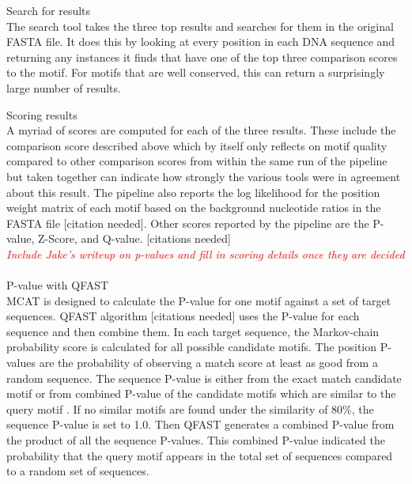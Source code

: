\documentclass[12pt]{article}
\newenvironment{SLOPPY}{\begin{sloppypar}\hbadness=10000}{\end{sloppypar}}
\newcommand{\comment}[1]{\textcolor{red}{\it{#1}}}
\begin{document}
\begin{SLOPPY}
\noindent
Search for results\\
The search tool takes the three top results and searches for them in the
original FASTA file. It does this by looking at every position in each DNA
sequence and returning any instances it finds that have one of the top three
comparison scores to the motif. For motifs that are well conserved, this
can return a surprisingly large number of results.\\
\end{SLOPPY}

\begin{SLOPPY}
\noindent
Scoring results\\
A myriad of scores are computed for each of the three results. These include
the comparison score described above which by itself only reflects on motif
quality compared to other comparison scores from within the same run of the
pipeline but taken together can indicate how strongly the various tools were
in agreement about this result.
The pipeline also reports the log likelihood
for the position weight matrix of each motif based on the background nucleotide
ratios in the FASTA file [citation needed].
Other scores reported by the pipeline are the P-value, Z-Score, and Q-value.
[citations needed]
\\
\comment{Include Jake's writeup on p-values and
fill in scoring details once they are decided}\\
\\
P-value with QFAST\\
MCAT is designed to calculate the P-value for one motif against a set of target sequences. QFAST algorithm [citations needed] uses the P-value for each sequence and then combine them.  In each target sequence, the Markov-chain probability score is calculated for all possible candidate motifs. The position P-values are the probability of observing a match score at least as good from a random sequence. The sequence P-value is either from the exact match candidate motif or from combined P-value of the  candidate motifs which are similar to the query motif . If no similar motifs are found under the similarity of 80\%, the sequence P-value is set to 1.0. Then QFAST generates a combined P-value from the product of all the sequence P-values. This combined P-value indicated the probability that the query motif appears in the total set of sequences compared to a random set of sequences.\\

\end{SLOPPY}
\end{document}
